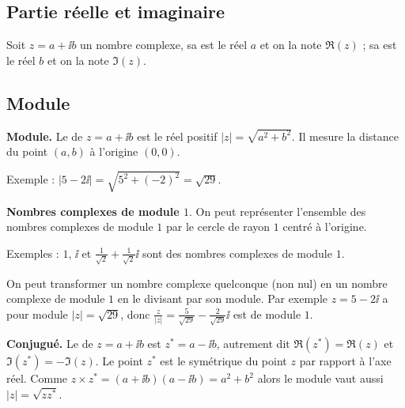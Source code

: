 \documentclass[11pt,class=report,crop=false]{standalone}
\begin{document}
\subsection{Partie réelle et imaginaire}

Soit $z = a + \ii b$ un nombre complexe, sa  est le réel $a$ et on
la note $\Re(z)$ ;
sa  est le réel $b$ et on la note $\Im(z)$.






\subsection{Module}



\textbf{Module.}
Le  de $z = a + \ii b$ est le réel positif $|z| = \sqrt{a^2 + b^2}$. Il mesure la distance du point $(a,b)$ à l'origine $(0,0)$.

Exemple : $|5-2\ii| = \sqrt{5^2+(-2)^2} = \sqrt{29}$.

\textbf{Nombres complexes de module $1$}. 
On peut représenter l'ensemble des nombres complexes de module $1$ par le cercle de rayon $1$ centré à l'origine.


Exemples : $1$, $\ii$ et $\frac1{\sqrt2} + \frac1{\sqrt2}\ii$ sont des nombres complexes de module $1$.

On peut transformer un nombre complexe quelconque (non nul) en un nombre complexe de module $1$ en le divisant par son module. Par exemple $z = 5-2\ii$ a pour module $|z| = \sqrt{29}$, donc
$\frac{z}{|z|} = \frac5{\sqrt{29}} - \frac2{\sqrt{29}}\ii$ est de module $1$.


\textbf{Conjugué.}
Le  de $z = a + \ii b$ est $z^* = a - \ii b$, autrement dit
  $\Re(z^*) = \Re(z)$ et
  $\Im(z^*) = - \Im (z)$.
  Le point $z^*$ est le symétrique du point $z$ par rapport à l'axe réel.
Comme $z \times z^* = (a+\ii b)(a-\ii b) = a^2+b^2$ alors  le module vaut aussi $|z| = \sqrt{z z^*}$.
\end{document}
